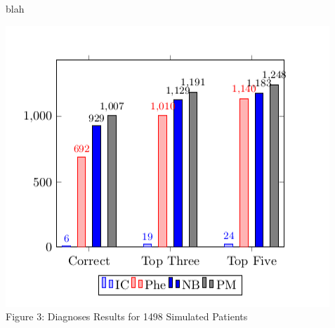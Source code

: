 \documentclass[final]{beamer} %
\begin{document}
\begin{frame}{}
\begin{columns}[T]
\begin{column}{0.3\linewidth}
\begin{block}{\Huge }
    \end{block}

    \begin{block}{\large blah}

\centering
\includegraphics[width=.7\textwidth ]{sim_patients}
   \\
   Figure 3: Diagnoses Results for 1498 Simulated Patients
      \end{block}
    \end{column}
    \end{columns}
  \end{frame}
  
\end{document}
